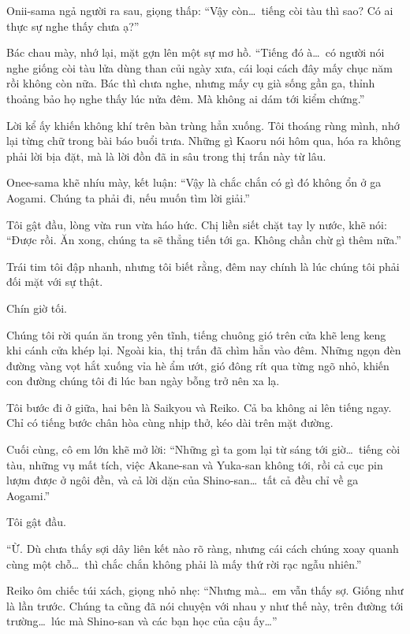 \documentclass[../main.tex]{subfiles}
\begin{document}
Onii-sama ngả người ra sau, giọng thấp: ``Vậy còn\dots\ tiếng còi tàu thì sao? Có ai thực sự nghe thấy chưa ạ?''

Bác chau mày, nhớ lại, mặt gợn lên một sự mơ hồ. ``Tiếng đó à\dots\ có người nói nghe giống còi tàu lửa dùng than củi ngày xưa, cái loại cách đây mấy chục năm rồi không còn nữa. Bác thì chưa nghe, nhưng mấy cụ già sống gần ga, thỉnh thoảng bảo họ nghe thấy lúc nửa đêm. Mà không ai dám tới kiểm chứng.''

Lời kể ấy khiến không khí trên bàn trùng hẳn xuống. Tôi thoáng rùng mình, nhớ lại từng chữ trong bài báo buổi trưa. Những gì Kaoru nói hôm qua, hóa ra không phải lời bịa đặt, mà là lời đồn đã in sâu trong thị trấn này từ lâu.

Onee-sama khẽ nhíu mày, kết luận:
``Vậy là chắc chắn có gì đó không ổn ở ga Aogami. Chúng ta phải đi, nếu muốn tìm lời giải.''

Tôi gật đầu, lòng vừa run vừa háo hức. Chị liền siết chặt tay ly nước, khẽ nói: ``Được rồi. Ăn xong, chúng ta sẽ thẳng tiến tới ga. Không chần chừ gì thêm nữa.''

Trái tim tôi đập nhanh, nhưng tôi biết rằng, đêm nay chính là lúc chúng tôi phải đối mặt với sự thật.


Chín giờ tối.

Chúng tôi rời quán ăn trong yên tĩnh, tiếng chuông gió trên cửa khẽ leng keng khi cánh cửa khép lại. Ngoài kia, thị trấn đã chìm hẳn vào đêm. Những ngọn đèn đường vàng vọt hắt xuống vỉa hè ẩm ướt, gió đông rít qua từng ngõ nhỏ, khiến con đường chúng tôi đi lúc ban ngày bỗng trở nên xa lạ.

Tôi bước đi ở giữa, hai bên là Saikyou và Reiko. Cả ba không ai lên tiếng ngay. Chỉ có tiếng bước chân hòa cùng nhịp thở, kéo dài trên mặt đường.

Cuối cùng, cô em lớn khẽ mở lời: ``Những gì ta gom lại từ sáng tới giờ\dots\ tiếng còi tàu, những vụ mất tích, việc Akane-san và Yuka-san không tới, rồi cả cục pin lượm được ở ngôi đền, và cả lời dặn của Shino-san\dots\ tất cả đều chỉ về ga Aogami.''

Tôi gật đầu.

``Ừ. Dù chưa thấy sợi dây liên kết nào rõ ràng, nhưng cái cách chúng xoay quanh cùng một chỗ\dots\ thì chắc chắn không phải là mấy thứ rời rạc ngẫu nhiên.''

Reiko ôm chiếc túi xách, giọng nhỏ nhẹ: ``Nhưng mà\dots\ em vẫn thấy sợ. Giống như là lần trước. Chúng ta cũng đã nói chuyện với nhau y như thế này, trên đường tới trường\dots\ lúc mà Shino-san và các bạn học của cậu ấy\dots''
\end{document}
